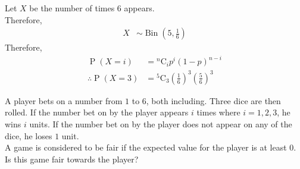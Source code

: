\documentclass[titlepage, fleqn, a4paper, 12pt, twoside]{article}
\theoremstyle{definition}
\theoremstyle{theorem}
\DeclareMathOperator{\prob}{\mathrm{P}}
\DeclareMathOperator{\bin}{\mathrm{Bin}}
\newcommand*{\comb}[2]{{}^{#1}\mathrm{C}_{#2}}%
\begin{document}
\begin{solution}
	Let $X$ be the number of times $6$ appears.\\
	Therefore,
	\begin{align*}
		X &\sim \bin\left( 5,\frac{1}{6} \right)
	\end{align*}
	Therefore,
	\begin{align*}
		\prob(X = i)            & = \comb{n}{i} p^i (1 - p)^{n - i} \\
		\therefore \prob(X = 3) & = \comb{5}{3} \left( \frac{1}{6} \right)^3 \left( \frac{5}{6} \right)^3
	\end{align*}
\end{solution}

\begin{question}
	A player bets on a number from $1$ to $6$, both including.
	Three dice are then rolled.
	If the number bet on by the player appears $i$ times where $i = 1,2,3$, he wins $i$ units.
	If the number bet on by the player does not appear on any of the dice, he loses $1$ unit.\\
	A game is considered to be fair if the expected value for the player is at least $0$.
	Is this game fair towards the player?
\end{question}
\end{document}
